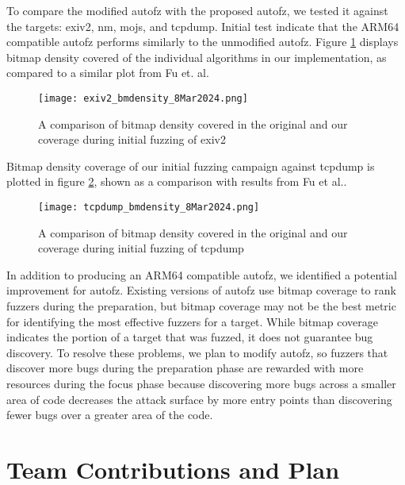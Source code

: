 To compare the  modified autofz with the proposed autofz, we tested it against the targets: exiv2, 
nm, mojs, and tcpdump. Initial test indicate that the ARM64 compatible autofz performs similarly to 
the unmodified autofz. Figure \ref{fig:exiv2_bmdensity_8Mar2024} displays bitmap density covered of 
the individual algorithms in our implementation, as compared to a similar plot from Fu et. al\cite{Fu}.

\begin{figure}
    \texttt{[image: exiv2\_bmdensity\_8Mar2024.png]}
    \centering
    \caption{A comparison of bitmap density covered in the original\cite{Fu} and our coverage during
     initial fuzzing of exiv2}
    \label{fig:exiv2_bmdensity_8Mar2024}
\end{figure}

Bitmap density coverage of our initial fuzzing campaign against tcpdump is plotted in figure 
\ref{fig:tcpdump_bmdensity_8Mar2024}, shown as a comparison with results from Fu et al.\cite{Fu}.


\begin{figure}
    \texttt{[image: tcpdump\_bmdensity\_8Mar2024.png]}
    \centering
    \caption{A comparison of bitmap density covered in the original\cite{Fu} and our coverage during initial fuzzing of tcpdump}
    \label{fig:tcpdump_bmdensity_8Mar2024}
\end{figure}

In addition to producing an ARM64 compatible autofz, we identified a potential improvement for autofz. 
Existing versions of autofz use bitmap coverage to rank fuzzers during the preparation, but bitmap 
coverage may not be the best metric for identifying the most effective fuzzers for a target. While 
bitmap coverage indicates the portion of a target that was fuzzed, it does not guarantee bug discovery. 
To resolve these problems, we plan to modify autofz, so fuzzers that discover more bugs during the 
preparation phase are rewarded with more resources during the focus phase because discovering more bugs 
across a smaller area of code decreases the attack surface by more entry points than discovering fewer 
bugs over a greater area of the code.

\section{Team Contributions and Plan}

